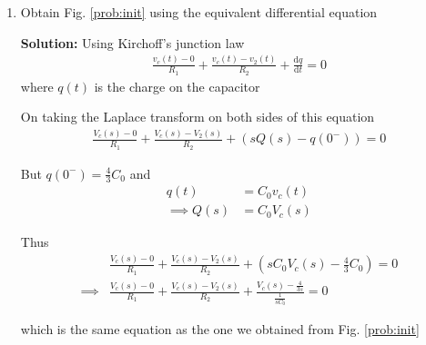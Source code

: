 \documentclass[journal,12pt,twocolumn]{IEEEtran}
\newcommand{\solution}{\noindent \textbf{Solution: }}
\providecommand{\brak}[1]{\ensuremath{\left(#1\right)}}
\providecommand{\der}[1]{\mathrm{d} #1}
\numberwithin{equation}{section}
\numberwithin{figure}{section}
\renewcommand\thesection{\arabic{section}}
\begin{document}
\begin{enumerate}[label=\thesection.\arabic*.,ref=\thesection.\theenumi]
	\item Obtain Fig. \ref{prob:init} using the equivalent differential equation
	
	\solution Using Kirchoff's junction law
	\begin{align}
		\frac{v_c(t) - 0}{R_1} + \frac{v_c(t) - v_2(t)}{R_2} + \frac{\der{q}}{\der{t}} = 0
	\end{align}
	where $q(t)$ is the charge on the capacitor
	
	On taking the Laplace transform on both sides of this equation
	\begin{align}
		\frac{V_c(s) - 0}{R_1} + \frac{V_c(s) - V_2(s)}{R_2} + \brak{sQ(s) - q(0^-)} = 0
	\end{align}
	
	But $q(0^-) = \frac43 C_0$ and 
	\begin{align}
		q(t) &= C_0v_c(t) \\
		\implies Q(s) &= C_0V_c(s)
	\end{align}
	
	Thus
	\begin{align}
		&\frac{V_c(s) - 0}{R_1} + \frac{V_c(s) - V_2(s)}{R_2} + \brak{sC_0V_c(s) - \frac43 C_0} = 0 \\
		\implies &\frac{V_c(s) - 0}{R_1} + 	\frac{V_c(s) - V_2(s)}{R_2} + \frac{V_c(s) - \frac{4}{3s}}{\frac{1}{sC_0}} = 0 
	\end{align}
	
	which is the same equation as the one we obtained from Fig. \ref{prob:init}
	\end{enumerate}
\end{document}
